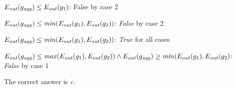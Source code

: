 \documentclass[	11pt,
				a4paper,
				twoside,
				titlepage,
				bibtotoc,
				openright,
				cleardoublepage=empty
				]{scrartcl}
\begin{document}
\begin{alnum}
	\item	$E_{\text{\emph{out}}}(g_{\text{\emph{agg}}}) \leq E_{\text{\emph{out}}}(g_1)$: False by case 2
	\item	$E_{\text{\emph{out}}}(g_{\text{\emph{agg}}}) \leq \text{\emph{min}}(E_{\text{\emph{out}}}(g_1), E_{\text{\emph{out}}}(g_2))$: \emph{False} by case 2
	\item	$E_{\text{\emph{out}}}(g_{\text{\emph{agg}}}) \leq \text{\emph{min}}(E_{\text{\emph{out}}}(g_1), E_{\text{\emph{out}}}(g_2))$: \emph{True} for all cases
	\item	$E_{\text{\emph{out}}}(g_{\text{\emph{agg}}}) \leq \text{\emph{max}}(E_{\text{\emph{out}}}(g_1), E_{\text{\emph{out}}}(g_2)) \land E_{\text{\emph{out}}}(g_{\text{\emph{agg}}}) \geq \text{\emph{min}}(E_{\text{\emph{out}}}(g_1), E_{\text{\emph{out}}}(g_2)$:	\emph{False} by case 1\\
\end{alnum}

The correct answer is \emph{c}.

\vspace{\baselineskip}
\end{document}
